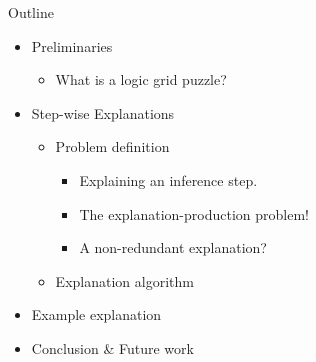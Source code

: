 \documentclass{beamer}
\begin{document}
\begin{frame}{Outline}

    \begin{itemize}
        \item Preliminaries
              \begin{itemize}
                  \item What is a logic grid puzzle?
              \end{itemize}
        \item Step-wise Explanations
              \begin{itemize}
                  \item Problem definition
                        \begin{itemize}
                            \item Explaining an inference step.
                            \item The explanation-production problem!
                            \item A non-redundant explanation?
                        \end{itemize}
                  \item Explanation algorithm
              \end{itemize}
        \item Example explanation
        \item Conclusion \& Future work
    \end{itemize}
\end{frame}
\end{document}
